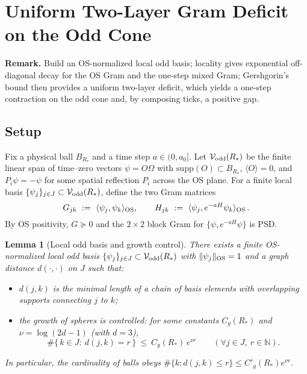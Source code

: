 \documentclass[11pt]{amsart}
\theoremstyle{plain}
\newtheorem{lemma}[theorem]{Lemma}
\theoremstyle{definition}
\theoremstyle{remark}
\begin{document}
\section{Uniform Two-Layer Gram Deficit on the Odd Cone}

\begin{mdframed}[linewidth=0.5pt, linecolor=gray!40, backgroundcolor=gray!5, roundcorner=2pt, innertopmargin=8pt, innerbottommargin=8pt, skipabove=10pt, skipbelow=10pt]
\textbf{Remark.} Build an OS-normalized local odd basis; locality gives exponential off-diagonal decay for the OS Gram and the one-step mixed Gram; Gershgorin's bound then provides a uniform two-layer deficit, which yields a one-step contraction on the odd cone and, by composing ticks, a positive gap.
\end{mdframed}

\subsection*{Setup}
Fix a physical ball $B_{R_*}$ and a time step $a\in(0,a_0]$. Let $\mathcal{V}_{\rm odd}(R_*)$ be the finite linear span of time--zero vectors $\psi=O\Omega$ with $\mathrm{supp}(O)\subset B_{R_*}$, $\langle O\rangle=0$, and $P_i\psi=-\psi$ for some spatial reflection $P_i$ across the OS plane. For a finite local basis $\{\psi_j\}_{j\in J}\subset \mathcal{V}_{\rm odd}(R_*)$, define the two Gram matrices
\[
  G_{jk}\ :=\ \langle\psi_j,\psi_k\rangle_{\rm OS},\qquad
  H_{jk}\ :=\ \langle\psi_j, e^{-aH}\psi_k\rangle_{\rm OS}\,.
\]
By OS positivity, $G\succeq 0$ and the $2\times 2$ block Gram for $\{\psi, e^{-aH}\psi\}$ is PSD.

\begin{lemma}[Local odd basis and growth control]\label{lem:local-basis-growth}
There exists a finite OS-normalized local odd basis $\{\psi_j\}_{j\in J}\subset \mathcal{V}_{\rm odd}(R_*)$ with $\|\psi_j\|_{\rm OS}=1$ and a graph distance $d(\cdot,\cdot)$ on $J$ such that:
\begin{itemize}
  \item[(i)] $d(j,k)$ is the minimal length of a chain of basis elements with overlapping supports connecting $j$ to $k$;
  \item[(ii)] the growth of spheres is controlled: for some constants $C_g(R_*)$ and $\nu=\log(2d-1)$ (with $d=3$),
  \[
    \#\{\,k\in J:\ d(j,k)=r\,\}\ \le\ C_g(R_*)\,e^{\nu r}\qquad(\forall j\in J,\ r\in\mathbb N).
  \]
\end{itemize}
In particular, the cardinality of balls obeys $\#\{k: d(j,k)\le r\}\le C'_g(R_*) e^{\nu r}$.
\end{lemma}
\end{document}
